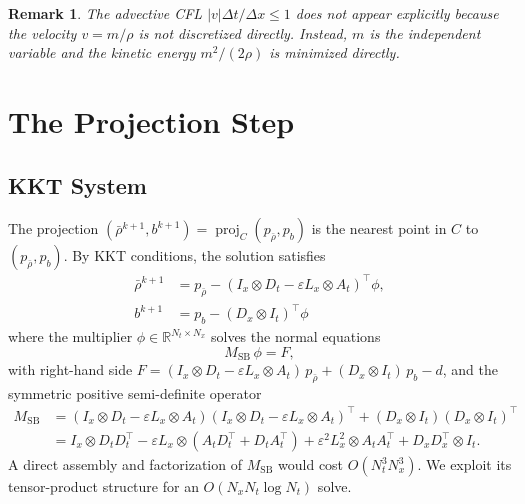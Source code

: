 \documentclass[11pt]{article}
\newtheorem{remark}{Remark}
\begin{document}
\begin{remark}
  The advective CFL $|v|\Delta t/\Delta x \leq 1$ does not appear explicitly
  because the velocity $v = m/\rho$ is not discretized directly.  Instead,
  $m$ is the independent variable and the kinetic energy $m^2/(2\rho)$ is
  minimized directly.
\end{remark}

\section{The Projection Step}\label{sec:projection}

\subsection{KKT System}

The projection
$(\bar\rho^{k+1}, b^{k+1}) = \operatorname{proj}_C(p_{\bar\rho}, p_b)$
is the nearest point in $C$ to $(p_{\bar\rho}, p_b)$.  By KKT conditions,
the solution satisfies
\begin{align}
  \bar\rho^{k+1} &= p_{\bar\rho}
    - (I_x \otimes D_t - \varepsilon L_x \otimes A_t)^\top \phi,
    \label{eq:KKT_rhobar}\\
  b^{k+1} &= p_b - (D_x \otimes I_t)^\top \phi
  \label{eq:KKT_b}
\end{align}
where the multiplier $\phi \in \mathbb{R}^{N_t \times N_x}$ solves the
normal equations
\begin{equation}
  M_{\mathrm{SB}}\,\phi = F,
  \label{eq:MSB_system}
\end{equation}
with right-hand side
$F = (I_x \otimes D_t - \varepsilon L_x \otimes A_t)\,p_{\bar\rho}
    + (D_x \otimes I_t)\,p_b - d$,
and the symmetric positive semi-definite operator
\begin{align}
  M_{\mathrm{SB}}
  &= (I_x \otimes D_t - \varepsilon L_x \otimes A_t)
     (I_x \otimes D_t - \varepsilon L_x \otimes A_t)^\top
   + (D_x \otimes I_t)(D_x \otimes I_t)^\top \nonumber\\
  &= I_x \otimes D_t D_t^\top
   - \varepsilon L_x \otimes (A_t D_t^\top + D_t A_t^\top)
   + \varepsilon^2 L_x^2 \otimes A_t A_t^\top
   + D_x D_x^\top \otimes I_t.
  \label{eq:MSB}
\end{align}
A direct assembly and factorization of $M_{\mathrm{SB}}$ would cost
$O(N_t^3 N_x^3)$.  We exploit its tensor-product structure for an
$O(N_x N_t \log N_t)$ solve.
\end{document}

